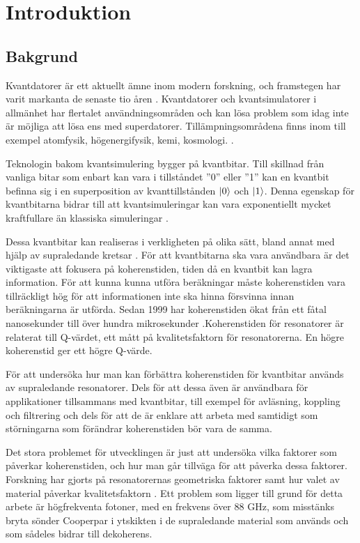 \documentclass[main.tex]{subfiles}
\begin{document}
\chapter{Introduktion}
\section{Bakgrund}
Kvantdatorer är ett aktuellt ämne inom modern forskning, och framstegen har varit markanta de senaste tio åren \autocite{Bylander2017}. Kvantdatorer och kvantsimulatorer i allmänhet har flertalet användningsområden och kan lösa problem som idag inte är möjliga att lösa ens med superdatorer. Tillämpningsområdena finns inom till exempel atomfysik, högenergifysik, kemi, kosmologi. \cite{applications}.


Teknologin bakom kvantsimulering bygger på kvantbitar. Till skillnad från vanliga bitar som enbart kan vara i tillståndet ''0'' eller ''1'' kan en kvantbit befinna sig i en superposition av kvanttillstånden $\ket{0}$ och $\ket{1}$. Denna egenskap för kvantbitarna bidrar till att kvantsimuleringar kan vara exponentiellt mycket kraftfullare än klassiska simuleringar \cite{Eckstein2013}.

Dessa kvantbitar kan realiseras i verkligheten på olika sätt, bland annat med hjälp av supraledande kretsar \cite{Oliver2013}. För att kvantbitarna ska vara användbara är det viktigaste att fokusera på koherenstiden, tiden då en kvantbit kan lagra information. För att kunna kunna utföra beräkningar måste koherenstiden vara tillräckligt hög för att informationen inte ska hinna försvinna innan beräkningarna är utförda\cite{Eckstein2013}. Sedan 1999 har koherenstiden ökat från ett fåtal nanosekunder till över hundra mikrosekunder \cite{Wendin2016}.Koherenstiden för resonatorer är relaterat till Q-värdet, ett mått på kvalitetsfaktorn för resonatorerna. En högre koherenstid ger ett högre Q-värde.

För att undersöka hur man kan förbättra koherenstiden för kvantbitar används av supraledande resonatorer. Dels för att dessa även är användbara för applikationer tillsammans med kvantbitar, till exempel för avläsning, koppling och filtrering \cite{wendin2016} och dels för att de är enklare att arbeta med samtidigt som störningarna som förändrar koherenstiden bör vara de samma\cite{Oliver2013}. 

Det stora problemet för utvecklingen är just att undersöka vilka faktorer som påverkar koherenstiden, och hur man går tillväga för att påverka dessa faktorer. Forskning har gjorts på resonatorernas geometriska faktorer \cite{Oliver2013}\cite{Chiaro2016} samt hur valet av material påverkar kvalitetsfaktorn \cite{Eckstein2013}. Ett problem som ligger till grund för detta arbete är högfrekventa fotoner, med en frekvens över 88 GHz, som misstänks bryta sönder Cooperpar i ytskikten i de supraledande material som används och som sådeles bidrar till dekoherens.
\end{document}
